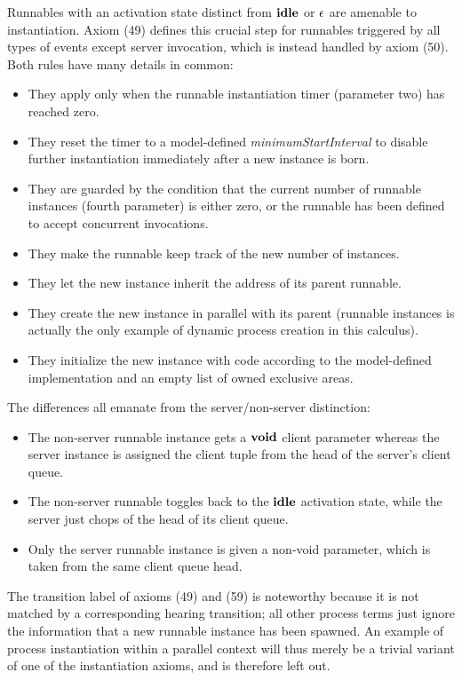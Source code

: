 \documentclass[twocolumn]{article}
\begin{document}
Runnables with an activation state distinct from $\textbf{idle}$ or $\epsilon$ are amenable to instantiation. Axiom (49) defines this crucial step for runnables triggered by all types of events except server invocation, which is instead handled by axiom (50). Both rules have many details in common:
\begin{itemize}
\item They apply only when the runnable instantiation timer (parameter two) has reached zero.
\item They reset the timer to a model-defined {\em minimumStartInterval} to disable further instantiation immediately after a new instance is born.
\item They are guarded by the condition that the current number of runnable instances (fourth parameter) is either zero, or the runnable has been defined to accept concurrent invocations.
\item They make the runnable keep track of the new number of instances.
\item They let the new instance inherit the address of its parent runnable.
\item They create the new instance in parallel with its parent (runnable instances is actually the only example of dynamic process creation in this calculus).
\item They initialize the new instance with code according to the model-defined implementation and an empty list of owned exclusive areas.
\end{itemize}
The differences all emanate from the server/non-server distinction:
\begin{itemize}
\item The non-server runnable instance gets a $\textbf{void}$ client parameter whereas the server instance is assigned the client tuple from the head of the server's client queue.
\item The non-server runnable toggles back to the $\textbf{idle}$ activation state, while the server just chops of the head of its client queue.
\item Only the server runnable instance is given a non-void parameter, which is taken from the same client queue head.
\end{itemize}
The transition label of axioms (49) and (59) is noteworthy because it is not matched by a corresponding hearing transition; all other process terms just ignore the information that a new runnable instance has been spawned. An example of process instantiation within a parallel context will thus merely be a trivial variant of one of the instantiation axioms, and is therefore left out.
\end{document}
